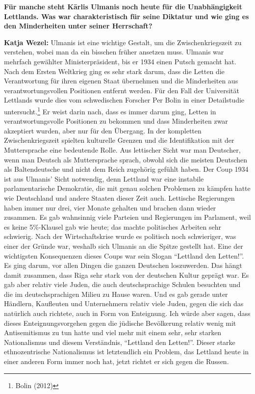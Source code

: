 \textbf{Für manche steht Kārlis Ulmanis noch heute für die Unabhängigkeit Lettlands. Was war charakteristisch für seine Diktatur und wie ging es den Minderheiten unter seiner Herrschaft?} 

\textbf{Katja Wezel:} Ulmanis ist eine wichtige Gestalt, um die Zwischenkriegszeit zu verstehen, wobei man da ein bisschen früher ansetzen muss. Ulmanis war mehrfach gewählter Ministerpräsident, bis er 1934 einen Putsch gemacht hat. Nach dem Ersten Weltkrieg ging es sehr stark darum, dass die Letten die Verantwortung für ihren eigenen Staat übernehmen und die Minderheiten aus verantwortungsvollen Positionen entfernt werden. Für den Fall der Universität Lettlands wurde dies vom schwedischen Forscher Per Bolin in einer Detailstudie untersucht.\footnote{Bolin (2012)} Er weist darin nach, dass es immer darum ging, Letten in verantwortungsvolle Positionen zu bekommen und dass Minderheiten zwar akzeptiert wurden, aber nur für den Übergang. 
In der kompletten Zwischenkriegszeit spielten kulturelle Grenzen und die Identifikation mit der Muttersprache eine bedeutende Rolle. Aus lettischer Sicht war man Deutscher, wenn man Deutsch als Muttersprache sprach, obwohl sich die meisten Deutschen als Baltendeutsche und nicht dem Reich zugehörig gefühlt haben. 
Der Coup 1934 ist aus Ulmanis' Sicht notwendig, denn Lettland war eine instabile parlamentarische Demokratie, die mit genau solchen Problemen zu kämpfen hatte wie Deutschland und andere Staaten dieser Zeit auch. Lettische Regierungen haben immer nur drei, vier Monate gehalten und brachen dann wieder zusammen. Es gab wahnsinnig viele Parteien und Regierungen im Parlament, weil es keine 5\%-Klausel gab wie heute; das machte politisches Arbeiten sehr schwierig. Nach der Wirtschaftskrise wurde es politisch noch schwieriger, was einer der Gründe war, weshalb sich Ulmanis an die Spitze gestellt hat. Eine der wichtigsten Konsequenzen dieses Coups war sein Slogan ``Lettland den Letten!''. Es ging darum, vor allen Dingen die ganzen Deutschen loszuwerden. Das hängt damit zusammen, dass Riga sehr stark von der deutschen Kultur geprägt war. Es gab aber relativ viele Juden, die auch deutschsprachige Schulen besuchten und die im deutschsprachigen Milieu zu Hause waren. Und es gab gerade unter Händlern, Kaufleuten und Unternehmern relativ viele Juden, gegen die sich das natürlich auch richtete, auch in Form von Enteignung. Ich würde aber sagen, dass dieses Enteignungsvorgehen gegen die jüdische Bevölkerung relativ wenig mit Antisemitismus zu tun hatte und viel mehr mit einem sehr, sehr starken Nationalismus und diesem Verständnis, ``Lettland den Letten!''. Dieser starke ethnozentrische Nationalismus ist letztendlich ein Problem, das Lettland heute in einer anderen Form immer noch hat, jetzt richtet er sich gegen die Russen. 

